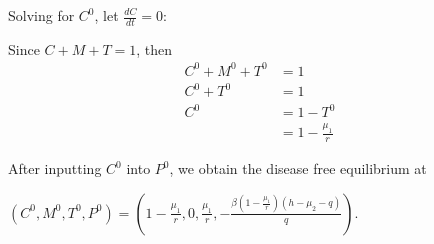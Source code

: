 \documentclass[12pt]{article}
\begin{document}
        Solving for $C^{0}$, let $\frac{dC}{dt} = 0$: \\ \par
        Since $C + M + T = 1$, then
            \begin{align*}
                C^{0} + M^{0} + T^{0} &= 1 \\
                C^{0} + T^{0} &= 1 \\
                C^{0}  &= 1 - T^{0} \\
                &= 1 - \frac{\mu_{1}}{r}
            \end{align*}
            
        After inputting $C^{0}$ into $P^{0}$, we obtain the disease free equilibrium at \\
        \begin{center}
        $\displaystyle{(C^{0}, M^{0}, T^{0}, P^{0}) = \left(1 - \frac{\mu_{1}}{r}, 0, \frac{\mu_{1}}{r}, -\frac{\beta(1 - \frac{\mu_{1}}{r})(h - \mu_{2} - q)}{q }\right)}$. 
        \end{center}
        
\end{document}
